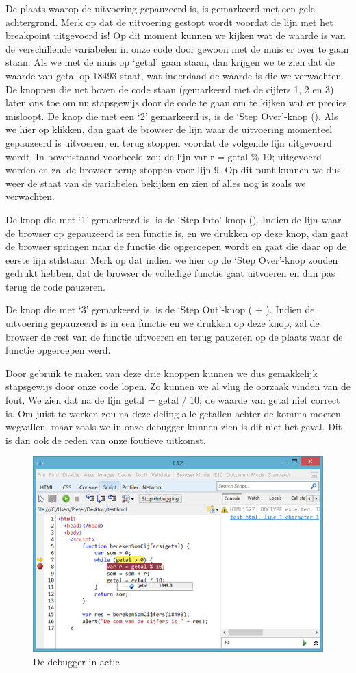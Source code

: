 De plaats waarop de uitvoering gepauzeerd is, is gemarkeerd met een gele achtergrond. Merk op dat de uitvoering gestopt wordt voordat de lijn met het breakpoint uitgevoerd is! Op dit moment kunnen we kijken wat de waarde is van de verschillende variabelen in onze code door gewoon met de muis er over te gaan staan. Als we met de muis op `getal' gaan staan, dan krijgen we te zien dat de waarde van getal op 18493 staat, wat inderdaad de waarde is die we verwachten.
De knoppen die net boven de code staan (gemarkeerd met de cijfers 1, 2 en 3) laten ons toe om nu stapsgewijs door de code te gaan om te kijken wat er precies misloopt. De knop die met een `2' gemarkeerd is, is de `Step Over'-knop (). Als we hier op klikken, dan gaat de browser de lijn waar de uitvoering momenteel gepauzeerd is uitvoeren, en terug stoppen voordat de volgende lijn uitgevoerd wordt. In bovenstaand voorbeeld zou de lijn var r = getal \% 10; uitgevoerd worden en zal de browser terug stoppen voor lijn 9. Op dit punt kunnen we dus weer de staat van de variabelen bekijken en zien of alles nog is zoals we verwachten.

De knop die met `1' gemarkeerd is, is de `Step Into'-knop (). Indien de lijn waar de browser op gepauzeerd is een functie is, en we drukken op deze knop, dan gaat de browser springen naar de functie  die opgeroepen wordt en gaat die daar op de eerste lijn stilstaan. Merk op dat indien we hier op de `Step Over'-knop zouden gedrukt hebben, dat de browser de volledige functie gaat uitvoeren en dan pas terug de code pauzeren.

De knop die met `3' gemarkeerd is, is de `Step Out'-knop ( + ). Indien de uitvoering gepauzeerd is in een functie en we drukken op deze knop, zal de browser de rest van de functie uitvoeren en terug pauzeren op de plaats waar de functie opgeroepen werd.

Door gebruik te maken van deze drie knoppen kunnen we dus gemakkelijk stapsgewijs door onze code lopen. Zo kunnen we al vlug de oorzaak vinden van de fout. We zien dat na de lijn getal = getal / 10; de waarde van getal niet correct is. Om juist te werken zou na deze deling alle getallen achter de komma moeten wegvallen, maar zoals we in onze debugger kunnen zien is dit niet het geval. Dit is dan ook de reden van onze foutieve uitkomst.

\begin{figure}
\centering
\includegraphics[scale=0.8]{Debuggen/debug4.png}
\caption{De debugger in actie}\label{fig:debug4}
\end{figure} 